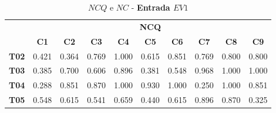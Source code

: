 \begin{table}[htbp]
	\centering
	\caption{$NCQ$ e $NC$ - \textbf{Entrada $EV1$}}
	\begin{tabular}{|c|ccccccccc|}
		\hline
		\rowcolor[HTML]{D0CECE} 
		\cellcolor[HTML]{D0CECE} & \multicolumn{9}{c|}{\cellcolor[HTML]{D0CECE}\textbf{NCQ}} \\ \cline{2-10} 
		\rowcolor[HTML]{D0CECE} 
		\multirow{-2}{*}{\cellcolor[HTML]{D0CECE}\textbf{Part.}} & \multicolumn{1}{c|}{\cellcolor[HTML]{D0CECE}\textbf{C1}} & \multicolumn{1}{c|}{\cellcolor[HTML]{D0CECE}\textbf{C2}} & \multicolumn{1}{c|}{\cellcolor[HTML]{D0CECE}\textbf{C3}} & \multicolumn{1}{c|}{\cellcolor[HTML]{D0CECE}\textbf{C4}} & \multicolumn{1}{c|}{\cellcolor[HTML]{D0CECE}\textbf{C5}} & \multicolumn{1}{c|}{\cellcolor[HTML]{D0CECE}\textbf{C6}} & \multicolumn{1}{c|}{\cellcolor[HTML]{D0CECE}\textbf{C7}} & \multicolumn{1}{c|}{\cellcolor[HTML]{D0CECE}\textbf{C8}} & \textbf{C9} \\ \hline
		\textbf{T02} & \multicolumn{1}{c|}{0.421} & \multicolumn{1}{c|}{0.364} & \multicolumn{1}{c|}{0.769} & \multicolumn{1}{c|}{1.000} & \multicolumn{1}{c|}{0.615} & \multicolumn{1}{c|}{0.851} & \multicolumn{1}{c|}{0.769} & \multicolumn{1}{c|}{0.800} & 0.800 \\ \hline
		\rowcolor[HTML]{F2F2F2} 
		\textbf{T03} & \multicolumn{1}{c|}{\cellcolor[HTML]{F2F2F2}0.385} & \multicolumn{1}{c|}{\cellcolor[HTML]{F2F2F2}0.700} & \multicolumn{1}{c|}{\cellcolor[HTML]{F2F2F2}0.606} & \multicolumn{1}{c|}{\cellcolor[HTML]{F2F2F2}0.896} & \multicolumn{1}{c|}{\cellcolor[HTML]{F2F2F2}0.381} & \multicolumn{1}{c|}{\cellcolor[HTML]{F2F2F2}0.548} & \multicolumn{1}{c|}{\cellcolor[HTML]{F2F2F2}0.968} & \multicolumn{1}{c|}{\cellcolor[HTML]{F2F2F2}1.000} & 1.000 \\ \hline
		\textbf{T04} & \multicolumn{1}{c|}{0.288} & \multicolumn{1}{c|}{0.851} & \multicolumn{1}{c|}{0.870} & \multicolumn{1}{c|}{1.000} & \multicolumn{1}{c|}{0.930} & \multicolumn{1}{c|}{1.000} & \multicolumn{1}{c|}{0.250} & \multicolumn{1}{c|}{1.000} & 0.851 \\ \hline
		\rowcolor[HTML]{F2F2F2} 
		\textbf{T05} & \multicolumn{1}{c|}{\cellcolor[HTML]{F2F2F2}0.548} & \multicolumn{1}{c|}{\cellcolor[HTML]{F2F2F2}0.615} & \multicolumn{1}{c|}{\cellcolor[HTML]{F2F2F2}0.541} & \multicolumn{1}{c|}{\cellcolor[HTML]{F2F2F2}0.659} & \multicolumn{1}{c|}{\cellcolor[HTML]{F2F2F2}0.440} & \multicolumn{1}{c|}{\cellcolor[HTML]{F2F2F2}0.615} & \multicolumn{1}{c|}{\cellcolor[HTML]{F2F2F2}0.896} & \multicolumn{1}{c|}{\cellcolor[HTML]{F2F2F2}0.870} & 0.325 \\ \hline

\end{tabular}
\end{table}
